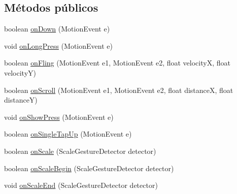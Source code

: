 \subsection*{Métodos públicos}
\begin{DoxyCompactItemize}
\item 
boolean \hyperlink{classes_1_1ucm_1_1tfg_1_1controlremotolinux_1_1client_1_1controller_1_1CanvasActivity_1_1GestureListener_ab9bbf6372c5ef51802defd66e42c2a41}{on\-Down} (Motion\-Event e)
\item 
void \hyperlink{classes_1_1ucm_1_1tfg_1_1controlremotolinux_1_1client_1_1controller_1_1CanvasActivity_1_1GestureListener_a9047c32bc20fc9d04d0cd80a9b4d159c}{on\-Long\-Press} (Motion\-Event e)
\item 
boolean \hyperlink{classes_1_1ucm_1_1tfg_1_1controlremotolinux_1_1client_1_1controller_1_1CanvasActivity_1_1GestureListener_a91d0d0bab36a91c7458d563d46c6a454}{on\-Fling} (Motion\-Event e1, Motion\-Event e2, float velocity\-X, float velocity\-Y)
\item 
boolean \hyperlink{classes_1_1ucm_1_1tfg_1_1controlremotolinux_1_1client_1_1controller_1_1CanvasActivity_1_1GestureListener_a9e8b21806da72f62465932781965322f}{on\-Scroll} (Motion\-Event e1, Motion\-Event e2, float distance\-X, float distance\-Y)
\item 
void \hyperlink{classes_1_1ucm_1_1tfg_1_1controlremotolinux_1_1client_1_1controller_1_1CanvasActivity_1_1GestureListener_afd14433b5aa9071fb3700e0f452cb25b}{on\-Show\-Press} (Motion\-Event e)
\item 
boolean \hyperlink{classes_1_1ucm_1_1tfg_1_1controlremotolinux_1_1client_1_1controller_1_1CanvasActivity_1_1GestureListener_aed50074c59f6d951e8d3b6ded9f7ab1e}{on\-Single\-Tap\-Up} (Motion\-Event e)
\item 
boolean \hyperlink{classes_1_1ucm_1_1tfg_1_1controlremotolinux_1_1client_1_1controller_1_1CanvasActivity_1_1GestureListener_aca0b89d5c91b658e6b713dc3513b695d}{on\-Scale} (Scale\-Gesture\-Detector detector)
\item 
boolean \hyperlink{classes_1_1ucm_1_1tfg_1_1controlremotolinux_1_1client_1_1controller_1_1CanvasActivity_1_1GestureListener_a5a0cf5966099481e898f00a5eecfed54}{on\-Scale\-Begin} (Scale\-Gesture\-Detector detector)
\item 
void \hyperlink{classes_1_1ucm_1_1tfg_1_1controlremotolinux_1_1client_1_1controller_1_1CanvasActivity_1_1GestureListener_ac6a2d8cfb188726e816b5acc6dd69504}{on\-Scale\-End} (Scale\-Gesture\-Detector detector)
\end{DoxyCompactItemize}


